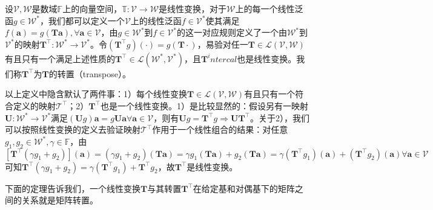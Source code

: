 \documentclass[main.tex]{subfiles}
\begin{document}
\begin{definition}[线性变换的转置]\label{def:II.4.6}
设$\mathcal{V},\mathcal{W}$是数域$\mathbb{F}$上的向量空间，$\mathbb{T}:\mathcal{V}\rightarrow\mathcal{W}$是线性变换，对于$\mathcal{W}$上的每一个线性泛函$g\in\mathcal{W}^*$，我们都可以定义一个$\mathcal{V}$上的线性泛函$f\in\mathcal{V}^*$使其满足$f\left(\mathbf{a}\right)=g\left(\mathbf{Ta}\right),\forall \mathbf{a}\in\mathcal{V}$，由$g\in\mathcal{W}^*$到$f\in\mathcal{V}^*$的这一对应规则定义了一个由$\mathcal{W}^*$到$\mathcal{V}^*$的映射$\mathbf{T}^\intercal:\mathcal{W}^*\rightarrow\mathcal{V}^*$。令$\left(\mathbf{T}^\intercal g\right)\left(\cdot\right)=g\left(\mathbf{T}\cdot\right)$，易验对任一$\mathbf{T}\in\mathcal{L}\left(\mathcal{V},\mathcal{W}\right)$有且只有一个满足上述性质的$\mathbf{T}^\intercal\in\mathcal{L}\left(\mathcal{W}^*,\mathcal{V}^*\right)$，且$\mathbf{T}^intercal$也是线性变换。我们称$\mathbf{T}^\intercal$为$\mathbf{T}$的转置（transpose）。
\end{definition}

以上定义中隐含默认了两件事：1）每个线性变换$\mathbf{T}\in\mathcal{L}\left(\mathcal{V},\mathcal{W}\right)$有且只有一个符合定义的映射$\mathcal{T}^\intercal$；2）$\mathbf{T}^\intercal$也是一个线性变换。1）是比较显然的：假设另有一映射$\mathbf{U}:\mathcal{W}^*\rightarrow\mathcal{V}^*$满足$\left(\mathbf{U}g\right)\mathbf{a}=g\mathbf{Ua}\forall\mathbf{a}\in\mathcal{V}$，则有$\mathbf{U}g=\mathbf{T}^\intercal g\Rightarrow\mathbf{U}\mathbf{T}^\intercal$。关于2），我们可以按照线性变换的定义去验证映射$\mathcal{T}^\intercal$作用于一个线性组合的结果：对任意$g_1,g_2\in\mathcal{W}^*,\gamma\in\mathbb{F}$，由$\left[\mathbf{T}^\intercal\left(\gamma g_1+g_2\right)\right]\left(\mathbf{a}\right)=\left(\gamma g_1+g_2\right)\left(\mathbf{Ta}\right)=\gamma g_1\left(\mathbf{Ta}\right)+g_2\left(\mathbf{Ta}\right)=\gamma\left(\mathbf{T}^\intercal g_1\right)\left(\mathbf{a}\right)+\left(\mathbf{T}^\intercal g_2\right)\left(\mathbf{a}\right)\forall\mathbf{a}\in\mathcal{V}$可知$\mathbf{T}^\intercal\left(\gamma g_1+g_2\right)=\gamma\left(\mathbf{T}^\intercal g_1\right)+\mathbf{T}^\intercal g_2$，故$\mathbf{T}^\intercal$是线性变换。

下面的定理告诉我们，一个线性变换$\mathbf{T}$与其转置$\mathbf{T}^\intercal$在给定基和对偶基下的矩阵之间的关系就是矩阵转置。
\end{document}
